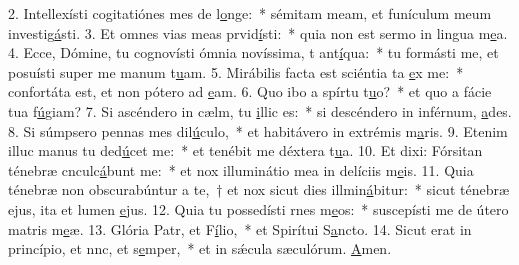 2. Intellexísti cogitatiónes mes de l\uline{o}nge:~* sémitam meam, et funículum meum investig\uline{á}sti.
3. Et omnes vias meas prvid\uline{í}sti:~* quia non est sermo in lingua m\uline{e}a.
4. Ecce, Dómine, tu cognovísti ómnia novíssima, t ant\uline{í}qua:~* tu formásti me, et posuísti super me manum t\uline{u}am.
5. Mirábilis facta est sciéntia ta \uline{e}x me:~* confortáta est, et non pótero ad \uline{e}am.
6. Quo ibo a spírtu t\uline{u}o?~* et quo a fácie tua f\uline{ú}giam?
7. Si ascéndero in cælm, tu \uline{i}llic es:~* si descéndero in inférnum, \uline{a}des.
8. Si súmpsero pennas mes dil\uline{ú}culo,~* et habitávero in extrémis m\uline{a}ris.
9. Etenim illuc manus tu ded\uline{ú}cet me:~* et tenébit me déxtera t\uline{u}a.
10. Et dixi: Fórsitan ténebræ cnculc\uline{á}bunt me:~* et nox illuminátio mea in delíciis m\uline{e}is.
11. Quia ténebræ non obscurabúntur a te,~† et nox sicut dies illmin\uline{á}bitur:~* sicut ténebræ ejus, ita et lumen \uline{e}jus.
12. Quia tu possedísti rnes m\uline{e}os:~* suscepísti me de útero matris m\uline{e}æ.
13. Glória Patr, et F\uline{í}lio,~* et Spirítui S\uline{a}ncto.
14. Sicut erat in princípio, et nnc, et s\uline{e}mper,~* et in sǽcula sæculórum. \uline{A}men.
